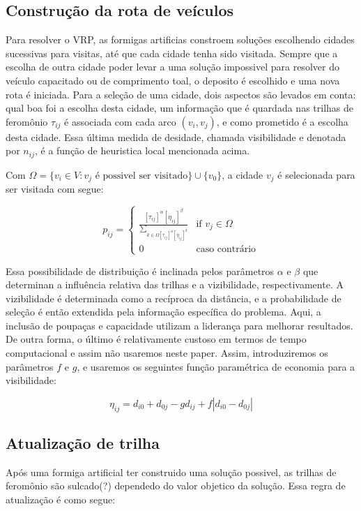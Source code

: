 \subsection{Construção da rota de veículos}

 Para resolver o VRP, as formigas artificias constroem soluções escolhendo cidades sucessivas para
visitas, até que cada cidade tenha sido visitada. Sempre que a escolha de outra cidade poder levar a
uma solução impossivel para resolver do veículo capacitado ou de comprimento toal, o deposito é
escolhido e uma nova rota é iniciada. Para a seleção de uma cidade, dois aspectos são levados em
conta: qual boa foi a escolha desta cidade, um informação que é quardada nas trilhas de feromônio
$\tau_{ij}$ é associada com cada arco $(v_i, v_j)$, e como prometido é a escolha desta cidade. Essa
última medida de desidade, chamada visibilidade e denotada por $n_{ij}$, é a função de heuristica
local mencionada acima.


 Com $\Omega = \{ v_i \in V: v_j\textrm{ é possivel ser visitado} \} \cup \{v_0\}$, a cidade $v_j$ é
selecionada para ser visitada com segue:

\[p_{ij} = \left\{
\begin{array}{ll}
\frac{[\tau_{ij}]^\alpha[\eta_{ij}]^\beta}{\sum_{k\in\Omega[\tau_{ij}]^\alpha[\eta_{ij}]^\beta}}
& \textrm{if } v_j \in \Omega\\
0 & \textrm{caso contrário}
\end{array}\right.\]

 Essa possibilidade de distribuição é inclinada pelos parâmetros $\alpha$ e $\beta$ que determinan a
influência relativa das trilhas e a vizibilidade, respectivamente. A vizibilidade é determinada como
a recíproca da distância, e a probabilidade de seleção é então extendida pela informação específica
do problema. Aqui, a inclusão de poupaças e capacidade utilizam a liderança para melhorar
resultados. De outra forma, o último é relativamente custoso em termos de tempo computacional e
assim não usaremos neste paper. Assim, introduziremos os parâmetros $f$ e $g$, e usaremos os
seguintes função paramétrica de economia para a visibilidade:

 \[\eta_{ij} = d_{i0}+d_{0j}-gd_{ij}+f|d_{i0}-d_{0j}|\]

\subsection{Atualização de trilha}

 Após uma formiga artificial ter construido uma solução possivel, as trilhas de feromônio são
sulcado(?) dependedo do valor objetico da solução. Essa regra de atualização é como segue:

